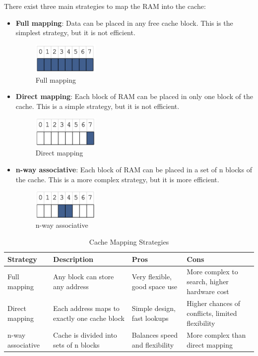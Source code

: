 There exist three main strategies to map the RAM into the cache:
\begin{itemize}
    \item \textbf{Full mapping}: Data can be placed in any free cache block. This is the simplest strategy, but it is not efficient.
    \begin{figure}[H]
        \centering
        \includegraphics[width=0.3\textwidth]{assets/opt6.png}
        \caption{Full mapping}
    \end{figure}
    \item \textbf{Direct mapping}: Each block of RAM can be placed in only one block of the cache. This is a simple strategy, but it is not efficient.
    \begin{figure}[H]
        \centering
        \includegraphics[width=0.3\textwidth]{assets/opt7.png}
        \caption{Direct mapping}
    \end{figure}
    \item \textbf{n-way associative}: Each block of RAM can be placed in a set of n blocks of the cache. This is a more complex strategy, but it is more efficient.
    \begin{figure}[H]
        \centering
        \includegraphics[width=0.3\textwidth]{assets/opt8.png}
        \caption{n-way associative}
    \end{figure}
\end{itemize}

\begin{table}[H]
\centering
\caption{Cache Mapping Strategies}
\begin{tabular}{l p{3.5cm} p{2.8cm} p{2.8cm}}
\toprule
\textbf{Strategy} & \textbf{Description} & \textbf{Pros} & \textbf{Cons} \\
\midrule
Full mapping 
& Any block can store any address 
& Very flexible, good space use
& More complex to search, higher hardware cost \\
\addlinespace
Direct mapping 
& Each address maps to exactly one cache block 
& Simple design, fast lookups
& Higher chances of conflicts, limited flexibility \\
\addlinespace
n-way associative 
& Cache is divided into sets of n blocks 
& Balances speed and flexibility 
& More complex than direct mapping \\
\bottomrule
\end{tabular}
\end{table}

